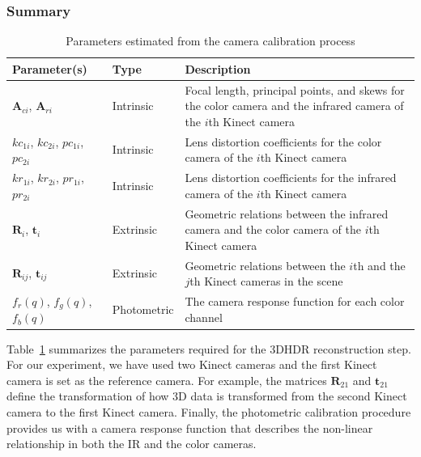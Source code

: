 \subsubsection{Summary}


\begin{table}[h]\footnotesize
\centering
  \caption{Parameters estimated from the camera calibration process}
  \label{tab_calibration}
    \begin{tabular}{|p{2.0cm}|l|p{4.0cm}|}
        \hline
       \bf{Parameter(s)}        &  \bf{Type}      &  \bf{Description}                                                        \\ \hline
        $\mathbf{A}_{ci}$, $\mathbf{A}_{ri}$  & Intrinsic & Focal length, principal points, and skews for the color camera and the infrared camera of the $i$th Kinect camera \\ \hline
        $kc_{1i}$, $kc_{2i}$, $pc_{1i}$, $pc_{2i}$  & Intrinsic & Lens distortion coefficients for the color camera of the $i$th Kinect camera \\  \hline
        $kr_{1i}$, $kr_{2i}$, $pr_{1i}$, $pr_{2i}$  & Intrinsic & Lens distortion coefficients for the infrared camera of the $i$th Kinect camera \\ \hline
        $\mathbf{R}_i$, $\mathbf{t}_i$             & Extrinsic & Geometric relations between the infrared camera and the color camera of the $i$th Kinect camera \\ \hline
        $\mathbf{R}_{ij}$, $\mathbf{t}_{ij}$    & Extrinsic & Geometric relations between the $i$th and the $j$th Kinect cameras in the scene \\
        \hline
        $f_r(q)$, $f_g(q)$, $f_b(q)$    & Photometric & The camera response function for each color channel\\
        \hline
    \end{tabular}
\end{table}

Table~\ref{tab_calibration} summarizes the parameters required for the 3DHDR reconstruction step. For our experiment, we have used two Kinect cameras and the first Kinect camera is set as the reference camera. For example, the matrices $\mathbf{R}_{21}$ and $\mathbf{t}_{21}$ define the transformation of how 3D data is transformed from the second Kinect camera to the first Kinect camera. Finally, the photometric calibration procedure provides us with a camera response function that describes the non-linear relationship in both the IR and the color cameras.

